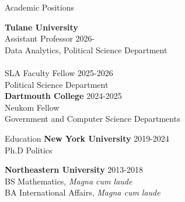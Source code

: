 \documentclass{resume} %
\begin{document}
	
	
	\begin{rSection}{Academic Positions}
		
		\bigskip
		
		\textbf{Tulane University}\\
		Assistant Professor \hfill {2026-}\\
		Data Analytics, Political Science Department\\
		\\
		SLA Faculty Fellow \hfill {2025-2026}\\
		Political Science Department\\
		
		\bigskip
		{\bf Dartmouth College} \hfill {2024-2025}\\
		Neukom Fellow \\
		Government and Computer Science Departments
		
	\end{rSection}
	
	\begin{rSection}{Education}
		\bigskip
		{\bf New York University} \hfill {2019-2024}\\
		Ph.D Politics
		
		{\bf Northeastern University} \hfill {2013-2018}\\
		BS Mathematics, {\it Magna cum laude}\\
		BA International Affairs, {\it Magna cum laude}\\
		
		
	\end{rSection}
	
\end{document}
